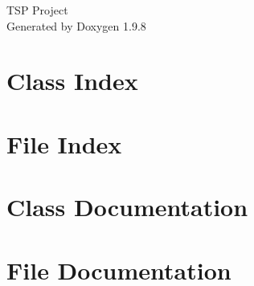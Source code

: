 \documentclass[twoside]{book}
\newcommand{\+}{\discretionary{\mbox{\scriptsize$\hookleftarrow$}}{}{}}
\newcommand{\clearemptydoublepage}{%
    \newpage{\pagestyle{empty}\cleardoublepage}%
  }
\begin{document}
  \raggedbottom
    \hypersetup{pageanchor=false,
                bookmarksnumbered=true,
                pdfencoding=unicode
               }
  \begin{titlepage}
  \vspace*{7cm}
  \begin{center}%
  {\Large TSP Project}\\
  \vspace*{1cm}
  {\large Generated by Doxygen 1.9.8}\\
  \end{center}
  \end{titlepage}
  \clearemptydoublepage
  \tableofcontents
  \clearemptydoublepage
  \hypersetup{pageanchor=true}

\chapter{Class Index}

\chapter{File Index}

\chapter{Class Documentation}





\chapter{File Documentation}


































  \backmatter
  \newpage
  \clearemptydoublepage
  \printindex
\end{document}
